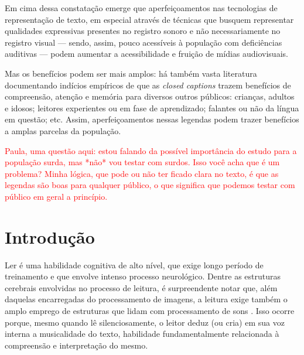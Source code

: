 \documentclass[a4paper,11pt,titlepage,singlespacing]{article}
\newcommand\todo[1]{\textcolor{red}{#1}}
\begin{document}
Em cima dessa constatação emerge que aperfeiçoamentos nas tecnologias de representação de texto, em especial através de técnicas que busquem representar qualidades expressivas presentes no registro sonoro e não necessariamente no registro visual — sendo, assim, pouco acessíveis à população com deficiências auditivas — podem aumentar a acessibilidade e fruição de mídias audiovisuais.

Mas os benefícios podem ser mais amplos: há também vasta literatura \cite{fiske_video_2015} documentando indícios empíricos de que as \textit{closed captions} trazem benefícios de compreensão, atenção e memória para diversos outros públicos: crianças, adultos e idosos; leitores experientes ou em fase de aprendizado; falantes ou não da língua em questão; etc. Assim, aperfeiçoamentos nessas legendas podem trazer benefícios a amplas parcelas da população.

\todo{Paula, uma questão aqui: estou falando da possível importância do estudo para a população surda, mas *não* vou testar com surdos. Isso você acha que é um problema? Minha lógica, que pode ou não ter ficado clara no texto, é que as legendas são boas para qualquer público, o que significa que podemos testar com público em geral a princípio. }


\newpage


\thispagestyle{empty}
\newpage
{}


\renewcommand{\contentsname}{Sumário}
\tableofcontents

\newpage

\section{Introdução}

\noindent Ler é uma habilidade cognitiva de alto nível, que exige longo período de treinamento e que envolve intenso processo neurológico. Dentre as estruturas cerebrais envolvidas no processo de leitura, é surpreendente notar que, além daquelas encarregadas do processamento de imagens, a leitura exige também o amplo emprego de estruturas que lidam com processamento de sons \cite[cap.7]{seidenberg2017}. Isso ocorre porque, mesmo quando lê silenciosamente, o leitor deduz (ou cria) em sua voz interna a musicalidade do texto, habilidade fundamentalmente relacionada à compreensão e interpretação do mesmo.
\end{document}
